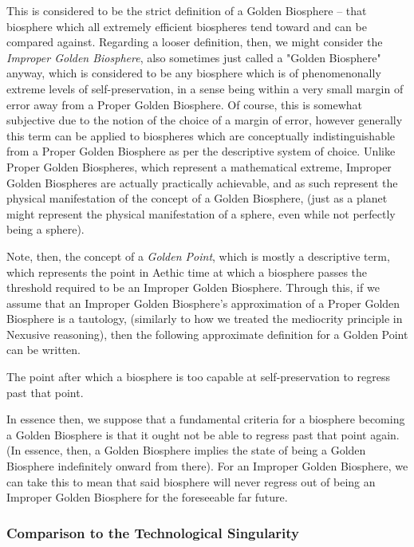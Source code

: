 This is considered to be the strict definition of a Golden Biosphere -- that biosphere which all extremely efficient biospheres tend toward and can be compared against. Regarding a looser definition, then, we might consider the \textit{Improper Golden Biosphere}, also sometimes just called a "Golden Biosphere" anyway, which is considered to be any biosphere which is of phenomenonally extreme levels of self-preservation, in a sense being within a very small margin of error away from a Proper Golden Biosphere. Of course, this is somewhat subjective due to the notion of the choice of a margin of error, however generally this term can be applied to biospheres which are conceptually indistinguishable from a Proper Golden Biosphere as per the descriptive system of choice. Unlike Proper Golden Biospheres, which represent a mathematical extreme, Improper Golden Biospheres are actually practically achievable, and as such represent the physical manifestation of the concept of a Golden Biosphere, (just as a planet might represent the physical manifestation of a sphere, even while not perfectly being a sphere). 

Note, then, the concept of a \textit{Golden Point}, which is mostly a descriptive term, which represents the point in Aethic time at which a biosphere passes the threshold required to be an Improper Golden Biosphere. Through this, if we assume that an Improper Golden Biosphere's approximation of a Proper Golden Biosphere is a tautology, (similarly to how we treated the mediocrity principle in Nexusive reasoning), then the following approximate definition for a Golden Point can be written. 
\begin{concept}
    The point after which a biosphere is too capable at self-preservation to regress past that point.
\end{concept}
In essence then, we suppose that a fundamental criteria for a biosphere becoming a Golden Biosphere is that it ought not be able to regress past that point again. (In essence, then, a Golden Biosphere implies the state of being a Golden Biosphere indefinitely onward from there). For an Improper Golden Biosphere, we can take this to mean that said biosphere will never regress out of being an Improper Golden Biosphere for the foreseeable far future. 

\subsubsection{Comparison to the Technological Singularity}

